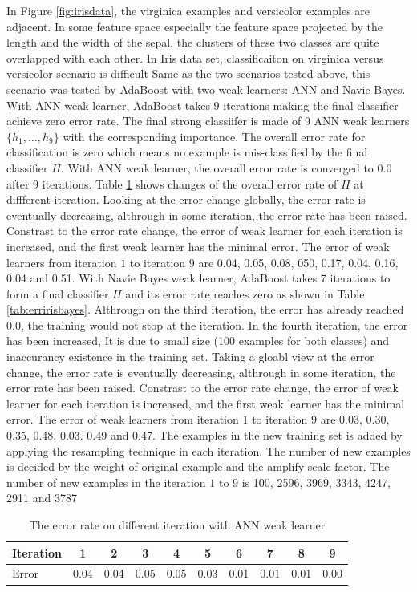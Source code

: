 In \mbox{Figure} \ref{fig:irisdata}, the virginica examples and versicolor examples are adjacent. In some feature space especially the feature space projected by the length and the width of the sepal, the clusters of these two classes are quite overlapped with each other. In Iris data set, classificaiton on virginica versus versicolor scenario is difficult  Same as the two scenarios tested above, this scenario was tested by AdaBoost with two weak learners: ANN and Navie Bayes.  With ANN weak learner, AdaBoost takes 9 iterations making the final classifier achieve zero error rate.  The final strong classiifer is made of 9 ANN weak learners $\{h_{1},\ldots,h_{9}\}$ with the corresponding importance. The overall error rate for classification is zero which means no example is mis-classified.by the final classifier $H$. With ANN weak learner, the overall error rate is converged to $0.0$ after 9 iterations. \mbox{Table} \ref{tab:erririsann} shows changes of the overall error rate of $H$ at diffferent iteration. Looking at the error change globally, the error rate is eventually decreasing, althrough in some iteration, the error rate has been raised. Constrast to the error rate change, the error of weak learner for each iteration is increased, and the first weak learner has the minimal error. The error of weak learners from iteration $1$ to iteration $9$ are 0.04, 0.05, 0.08, 050, 0.17, 0.04, 0.16, 0.04 and 0.51.
With Navie Bayes weak learner, AdaBoost takes 7 iterations to form a final classifier $H$ and its error rate reaches zero as shown in \mbox{Table} \ref{tab:erririsbayes}. Althrough on the third iteration, the error has already reached $0.0$, the training would not stop at the iteration. In the fourth iteration, the error has been increased, It  is due to small size (100 examples for both classes) and inaccurancy existence in the training set. Taking a gloabl view at the error change, the error rate is eventually decreasing, althrough in some iteration, the error rate has been raised. Constrast to the error rate change, the error of weak learner for each iteration is increased, and the first weak learner has the minimal error. The error of weak learners from iteration $1$ to iteration $9$ are 0.03, 0.30, 0.35, 0.48. 0.03. 0.49 and 0.47. The examples in the new training set is added by applying the resampling technique in each iteration. The number of new examples is decided by the weight of original example and the amplify scale factor. The number of new examples in the iteration $1$ to $9$ is 100, 2596, 3969, 3343, 4247, 2911 and 3787 
\begin{table}\label{tab:erririsann}
\begin{center}
  \begin{tabular}{|l|c|c|c|c|c|c|c|c|c|}
 \hline
Iteration & 1 & 2 & 3 & 4 & 5 & 6 & 7 & 8 & 9 \\
\hline \hline
Error & 0.04 & 0.04 & 0.05 & 0.05 & 0.03 & 0.01 & 0.01 & 0.01 & 0.00 \\
\hline
\end{tabular} 
\end{center}
\caption{The error rate on different iteration with ANN weak learner}
\end{table} 


